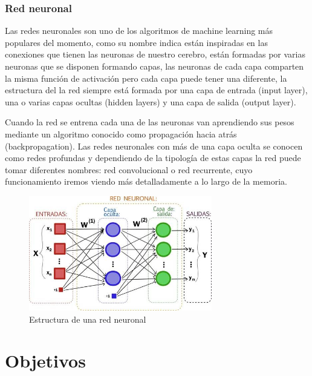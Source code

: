 \documentclass[a4paper, 12pt]{book}
\begin{document}
\subsection{Red neuronal}
\label{sec:red_neuronal}
Las redes neuronales son uno de los algoritmos de machine learning más populares del momento, como su nombre indica están inspiradas en las conexiones que tienen las neuronas de nuestro cerebro, están formadas por varias neuronas que se disponen formando capas, las neuronas de cada capa comparten la misma función de activación pero cada capa puede tener una diferente, la estructura del la red siempre está formada por una capa de entrada (input layer), una o varias capas ocultas (hidden layers) y una capa de salida (output layer).

Cuando la red se entrena cada una de las neuronas van aprendiendo sus pesos mediante un algoritmo conocido como propagación hacia atrás (backpropagation).
Las redes neuronales con más de una capa oculta se conocen como redes profundas y dependiendo de la tipología de estas capas la red puede tomar diferentes nombres: red convolucional o red recurrente, cuyo funcionamiento iremos viendo más detalladamente a lo largo de la memoria.

\begin{figure}
  \centering
  \includegraphics[width=8cm, keepaspectratio]{img/red_neuronal.jpg}
  \caption{Estructura de una red neuronal}
  \label{fig:neural_network}
\end{figure}



\cleardoublepage %
\chapter{Objetivos} %
\label{chap:objetivos} %
\end{document}
